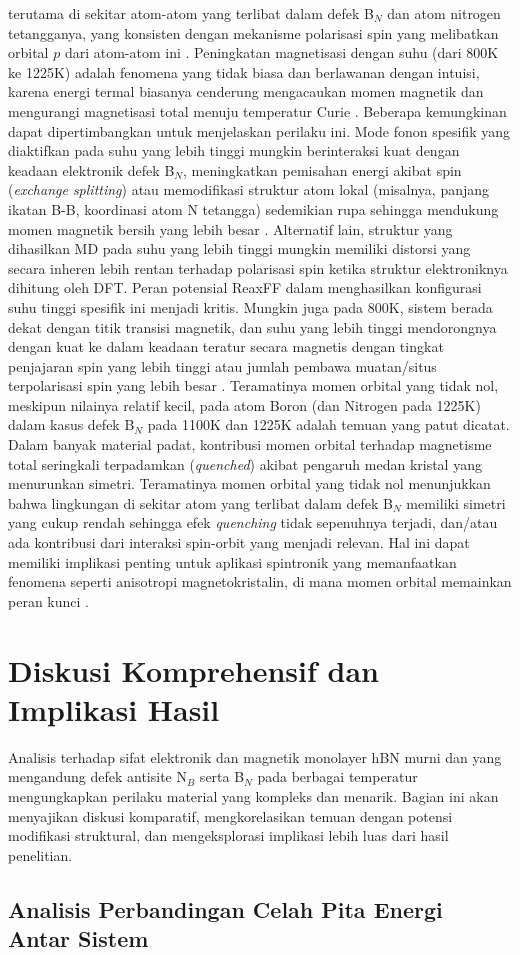 terutama di sekitar atom-atom yang terlibat dalam defek B$_N$ dan atom nitrogen tetangganya, yang konsisten dengan mekanisme polarisasi spin yang melibatkan orbital $p$ dari atom-atom ini . Peningkatan magnetisasi dengan suhu (dari 800K ke 1225K) adalah fenomena yang tidak biasa dan berlawanan dengan intuisi, karena energi termal biasanya cenderung mengacaukan momen magnetik dan mengurangi magnetisasi total menuju temperatur Curie . Beberapa kemungkinan dapat dipertimbangkan untuk menjelaskan perilaku ini. Mode fonon spesifik yang diaktifkan pada suhu yang lebih tinggi mungkin berinteraksi kuat dengan keadaan elektronik defek B$_N$, meningkatkan pemisahan energi akibat spin (\textit{exchange splitting}) atau memodifikasi struktur atom lokal (misalnya, panjang ikatan B-B, koordinasi atom N tetangga) sedemikian rupa sehingga mendukung momen magnetik bersih yang lebih besar . Alternatif lain, struktur yang dihasilkan MD pada suhu yang lebih tinggi mungkin memiliki distorsi yang secara inheren lebih rentan terhadap polarisasi spin ketika struktur elektroniknya dihitung oleh DFT. Peran potensial ReaxFF dalam menghasilkan konfigurasi suhu tinggi spesifik ini menjadi kritis. Mungkin juga pada 800K, sistem berada dekat dengan titik transisi magnetik, dan suhu yang lebih tinggi mendorongnya dengan kuat ke dalam keadaan teratur secara magnetis dengan tingkat penjajaran spin yang lebih tinggi atau jumlah pembawa muatan/situs terpolarisasi spin yang lebih besar . Teramatinya momen orbital yang tidak nol, meskipun nilainya relatif kecil, pada atom Boron (dan Nitrogen pada 1225K) dalam kasus defek B$_N$ pada 1100K dan 1225K  adalah temuan yang patut dicatat. Dalam banyak material padat, kontribusi momen orbital terhadap magnetisme total seringkali terpadamkan (\textit{quenched}) akibat pengaruh medan kristal yang menurunkan simetri. Teramatinya momen orbital yang tidak nol menunjukkan bahwa lingkungan di sekitar atom yang terlibat dalam defek B$_N$ memiliki simetri yang cukup rendah sehingga efek \textit{quenching} tidak sepenuhnya terjadi, dan/atau ada kontribusi dari interaksi spin-orbit yang menjadi relevan. Hal ini dapat memiliki implikasi penting untuk aplikasi spintronik yang memanfaatkan fenomena seperti anisotropi magnetokristalin, di mana momen orbital memainkan peran kunci . \section{Diskusi Komprehensif dan Implikasi Hasil}
\label{sec:diskusi_komprehensif}
Analisis terhadap sifat elektronik dan magnetik monolayer hBN murni dan yang mengandung defek antisite N$_B$ serta B$_N$ pada berbagai temperatur mengungkapkan perilaku material yang kompleks dan menarik. Bagian ini akan menyajikan diskusi komparatif, mengkorelasikan temuan dengan potensi modifikasi struktural, dan mengeksplorasi implikasi lebih luas dari hasil penelitian. \subsection{Analisis Perbandingan Celah Pita Energi Antar Sistem}
